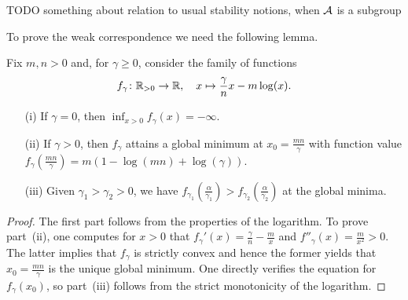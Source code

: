 TODO something about relation to usual stability notions, when $\mathcal{A}$ is a subgroup

To prove the weak correspondence we need the following lemma.

\begin{lemma}\label{lem:ForWeakCorrespondence}
	Fix $m,n > 0$ and, for $\gamma \geq 0$, consider the family of functions
	\[ f_{\gamma} \colon \mathbb R_{>0} \to \mathbb R, \quad x \mapsto \frac{\gamma}{n} x - m \log(x).\]
	\begin{itemize}\itemsep 3pt
		\item[(i)] If $\gamma = 0$, then $\inf_{x > 0} f_\gamma(x) = - \infty$.
		
		\item[(ii)] If $\gamma > 0$, then $f_{\gamma}$ attains a global minimum at $x_0 = \frac{m n}{\gamma}$ with function value $f_{\gamma}(\frac{m n}{\gamma}) = m (1 - \log(m n) + \log(\gamma))$. 
		
		\item[(iii)] Given $\gamma_1 > \gamma_2 > 0$, we have $f_{\gamma_1}(\frac{\alpha}{\gamma_1}) > f_{\gamma_2}(\frac{\alpha}{\gamma_2})$ at the global minima.
	\end{itemize}
\end{lemma}

\begin{proof}
	The first part follows from the properties of the logarithm.
	To prove part~(ii), one computes for $x > 0$ that $f_{\gamma}'(x) = \frac{\gamma}{n} - \frac{m}{x}$ and $f''_\gamma(x) = \frac{m}{x^2} > 0$. The latter implies that $f_{\gamma}$ is strictly convex and hence the former yields that $x_0 = \frac{m n}{\gamma}$ is the unique global minimum. 
	One directly verifies the equation for $f_{\gamma}(x_0)$, so part~(iii) follows from the strict monotonicity of the logarithm.
\end{proof}

